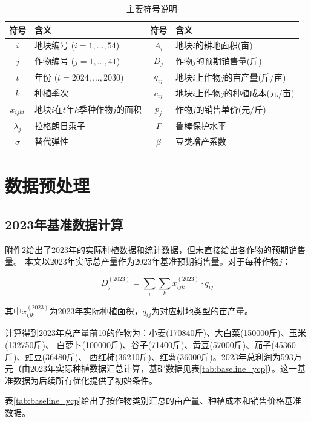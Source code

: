 \documentclass[12pt]{ctexart}
\begin{document}
\begin{table}[H]
\centering
\caption{主要符号说明}
\begin{tabular}{@{}c@{ }l@{ }c@{ }l@{}}
\toprule
\textbf{符号} & \textbf{含义} & \textbf{符号} & \textbf{含义} \\
\midrule
$i$ & 地块编号 ($i=1,\ldots,54$) & $A_i$ & 地块$i$的耕地面积(亩) \\
$j$ & 作物编号 ($j=1,\ldots,41$) & $D_j$ & 作物$j$的预期销售量(斤) \\
$t$ & 年份 ($t=2024,\ldots,2030$) & $q_{ij}$ & 地块$i$上作物$j$的亩产量(斤/亩) \\
$k$ & 种植季次 & $c_{ij}$ & 地块$i$上作物$j$的种植成本(元/亩) \\
$x_{ijkt}$ & 地块$i$在$t$年$k$季种作物$j$的面积 & $p_j$ & 作物$j$的销售单价(元/斤) \\
$\lambda_j$ & 拉格朗日乘子 & $\Gamma$ & 鲁棒保护水平 \\
$\sigma$ & 替代弹性 & $\beta$ & 豆类增产系数 \\
\bottomrule
\end{tabular}
\end{table}

\section{数据预处理}

\subsection{2023年基准数据计算}

附件2给出了2023年的实际种植数据和统计数据，但未直接给出各作物的预期销售量。
本文以2023年实际总产量作为2023年基准预期销售量。对于每种作物$j$：

\begin{equation}
    D_j^{(2023)} = \sum_{i} \sum_{k} x_{ijk}^{(2023)} \cdot q_{ij}
\end{equation}

其中$x_{ijk}^{(2023)}$为2023年实际种植面积，$q_{ij}$为对应耕地类型的亩产量。

计算得到2023年总产量前10的作物为：小麦(170840斤)、大白菜(150000斤)、玉米(132750斤)、
白萝卜(100000斤)、谷子(71400斤)、黄豆(57000斤)、茄子(45360斤)、豇豆(36480斤)、
西红柿(36210斤)、红薯(36000斤)。2023年总利润为593万元（由2023年实际种植数据汇总计算，基础数据见表\ref{tab:baseline_ycp}）。这一基准数据为后续所有优化提供了初始条件。

表\ref{tab:baseline_ycp}给出了按作物类别汇总的亩产量、种植成本和销售价格基准数据。
\end{document}
